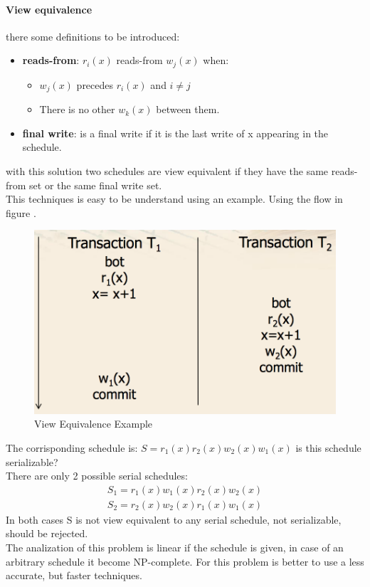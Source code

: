 \documentclass[12pt]{article}
\begin{document}
\paragraph{View equivalence} there some definitions to be introduced:
\begin{itemize}
  \item \textbf{reads-from}: $r_{i}(x)$ reads-from $w_{j}(x)$ when:
  \begin{itemize}
    \item $w_{j}(x)$ precedes $r_{i}(x)$ and $i \neq j$
    \item There is no other $w_{k}(x)$ between them.
  \end{itemize}
  \item \textbf{final write}: is a final write if it is the last write of x appearing in the schedule.
\end{itemize}
with this solution two schedules are view equivalent if they have the same reads-from set or the same final write set.\\
This techniques is easy to be understand using an example. Using the flow in figure .
\begin{figure}[h!]
  \includegraphics[width=\linewidth]{images/ex1.png}
  \caption{View Equivalence Example}
  \label{fig:ex1}
\end{figure}
The corrisponding schedule is: $S = r_{1}(x)r_{2}(x)w_{2}(x)w_{1}(x)$ is this schedule serializable?\\
There are only 2 possible serial schedules:
\begin{equation}
  \begin{gathered}
    S_{1} = r_{1}(x)w_{1}(x)r_{2}(x)w_{2}(x)\\
    S_{2} = r_{2}(x)w_{2}(x)r_{1}(x)w_{1}(x)
  \end{gathered}
\end{equation}
In both cases S is not view equivalent to any serial schedule, not serializable, should be rejected.\\
The analization of this problem is linear if the schedule is given, in case of an arbitrary schedule it become NP-complete. For this problem is better to use a less accurate, but faster techniques.
\end{document}
